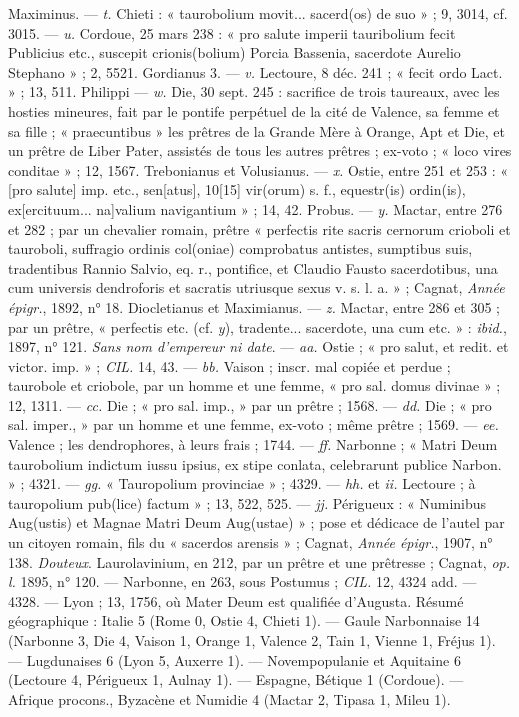 \documentclass[a4paper, 11pt, oneside, polutonikogreek, french]{article}
\begin{document}
Maximinus. --- \emph{t.} Chieti : « taurobolium movit... sacerd(os) de suo » ; 9, 3014, cf. 3015. --- \emph{u.} Cordoue, 25 mars 238 : « pro salute imperii tauribolium fecit Publicius etc., suscepit crionis(bolium) Porcia Bassenia, sacerdote Aurelio Stephano » ; 2, 5521.  
Gordianus 3. --- \emph{v.} Lectoure, 8 déc. 241 ; « fecit ordo Lact. » ; 13, 511.  
Philippi --- \emph{w.} Die, 30 sept. 245 : sacrifice de trois taureaux, avec les hosties mineures, fait par le pontife perpétuel de la cité de Valence, sa femme et sa fille ; « praecuntibus » les prêtres de la Grande Mère à Orange, Apt et Die, et un prêtre de Liber Pater, assistés de tous les autres prêtres ; ex-voto ; « loco vires conditae » ; 12, 1567.  
Trebonianus et Volusianus. --- \emph{x.} Ostie, entre 251 et 253 : « [pro salute] imp. etc., sen[atus], 10[15] vir(orum) s. f., equestr(is) ordin(is), ex[ercituum... na]valium navigantium » ; 14, 42.  
Probus. --- \emph{y.} Mactar, entre 276 et 282 ; par un chevalier romain, prêtre « perfectis rite sacris cernorum crioboli et tauroboli, suffragio ordinis col(oniae) comprobatus antistes, sumptibus suis, tradentibus Rannio Salvio, eq. r., pontifice, et Claudio Fausto sacerdotibus, una cum universis dendroforis et sacratis utriusque sexus v. s. l. a. » ; Cagnat, \emph{Année épigr.}, 1892, n° 18.  
Diocletianus et Maximianus. --- \emph{z.} Mactar, entre 286 et 305 ; par un prêtre, « perfectis etc. (cf. \emph{y}), tradente... sacerdote, una cum etc. » : \emph{ibid.}, 1897, n° 121.  
\emph{Sans nom d'empereur ni date}. --- \emph{aa.} Ostie ; « pro salut, et redit. et victor. imp. » ; \emph{CIL.} 14, 43. --- \emph{bb.} Vaison ; inscr. mal copiée et perdue ; taurobole et criobole, par un homme et une femme, « pro sal. domus divinae » ; 12, 1311. --- \emph{cc.} Die ; « pro sal. imp., » par un prêtre ; 1568. --- \emph{dd.} Die ; « pro sal. imper., » par un homme et une femme, ex-voto ; même prêtre ; 1569. --- \emph{ee.} Valence ; les dendrophores, à leurs frais ; 1744. --- \emph{ff.} Narbonne ; « Matri Deum taurobolium indictum iussu ipsius, ex stipe conlata, celebrarunt publice Narbon. » ; 4321. --- \emph{gg.} « Tauropolium provinciae » ; 4329. --- \emph{hh.} et \emph{ii.} Lectoure ; à tauropolium pub(lice) factum » ; 13, 522, 525. --- \emph{jj.} Périgueux : « Numinibus Aug(ustis) et Magnae Matri Deum Aug(ustae) » ; pose et dédicace de l'autel par un citoyen romain, fils du « sacerdos arensis » ; Cagnat, \emph{Année épigr.}, 1907, n° 138.  
\emph{Douteux}. Laurolavinium, en 212, par un prêtre et une prêtresse ; Cagnat, \emph{op. l.} 1895, n° 120. --- Narbonne, en 263, sous Postumus ; \emph{CIL.} 12, 4324 add. --- 4328. --- Lyon ; 13, 1756, où Mater Deum est qualifiée d'Augusta.  
Résumé géographique : Italie 5 (Rome 0, Ostie 4, Chieti 1). --- Gaule Narbonnaise 14 (Narbonne 3, Die 4, Vaison 1, Orange 1, Valence 2, Tain 1, Vienne 1, Fréjus 1). --- Lugdunaises 6 (Lyon 5, Auxerre 1). --- Novempopulanie et Aquitaine 6 (Lectoure 4, Périgueux 1, Aulnay 1). --- Espagne, Bétique 1 (Cordoue). --- Afrique procons., Byzacène et Numidie 4 (Mactar 2, Tipasa 1, Mileu 1). 
\end{document}
